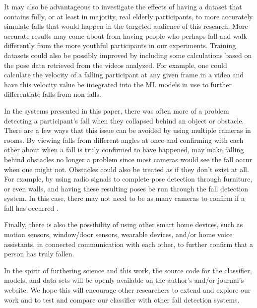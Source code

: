 It may also be advantageous to investigate the effects of having a dataset that contains fully, or at least in majority, real elderly participants, to more accurately simulate falls that would happen in the targeted audience of this research. More accurate results may come about from having people who perhaps fall and walk differently from the more youthful participants in our experiments. Training datasets could also be possibly improved by including some calculations based on the pose data retrieved from the videos analyzed. For example, one could calculate the velocity of a falling participant at any given frame in a video and have this velocity value be integrated into the ML models in use to further differentiate falls from non-falls.

In the systems presented in this paper, there was often more of a problem detecting a participant's fall when they collapsed behind an object or obstacle. There are a few ways that this issue can be avoided by using multiple cameras in rooms. By viewing falls from different angles at once and confirming with each other about when a fall is truly confirmed to have happened, may make falling behind obstacles no longer a problem since most cameras would see the fall occur when one might not. Obstacles could also be treated as if they don’t exist at all. For example, by using radio signals to complete pose detection through furniture, or even walls, and having these resulting poses be run through the fall detection system. In this case, there may not need to be as many cameras to confirm if a fall has occurred \cite{RN1005}.

Finally, there is also the possibility of using other smart home devices, such as motion sensors, window/door sensors, wearable devices, and/or home voice assistants, in connected communication with each other, to further confirm that a person has truly fallen.



In the spirit of furthering science and this work, the source code for the classifier, models, and data sets will be openly available on the author’s and/or journal’s website. We hope this will encourage other researchers to extend and explore our work and to test and compare our classifier with other fall detection systems.